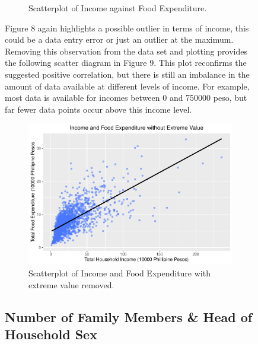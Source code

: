 \documentclass[
]{article}
\begin{document}
\begin{figure}[H]
\begin{figure}[H]
{}

\caption{Scatterplot of Income against Food Expenditure.}\label{fig:balance_plot}
\end{figure}

Figure 8 again highlights a possible outlier in terms of income, this
could be a data entry error or just an outlier at the maximum. Removing
this observation from the data set and plotting provides the following
scatter diagram in Figure 9. This plot reconfirms the suggested positive
correlation, but there is still an imbalance in the amount of data
available at different levels of income. For example, most data is
available for incomes between 0 and 750000 peso, but far fewer data
points occur above this income level.

\begin{figure}[H]

{\centering \includegraphics[width=0.8\linewidth]{Group_01_Project2_demo_files/figure-latex/balance without outlier-1} 

}

\caption{Scatterplot of Income and Food Expenditure with extreme value removed.}\label{fig:balance without outlier}
\end{figure}

\hypertarget{number-of-family-members-head-of-household-sex}{%
\subsection{Number of Family Members \& Head of Household
Sex}\label{number-of-family-members-head-of-household-sex}}

\begin{figure}[H]


\end{figure}
\end{figure}
\end{document}
